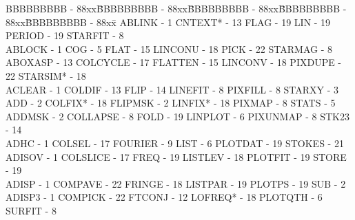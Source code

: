 {\scriptsize
\begin{tabbing}
BBBBBBBBB - 88xx\=BBBBBBBBB - 88xx\=BBBBBBBBB - 88xx\=BBBBBBBBB - 88xx\=BBBBBBBBB - 88xx\=\kill
 ABLINK - 1                              \>CNTEXT* - 13
   \>FLAG - 19                               \>
 LIN - 19                                \>PERIOD - 19
   \>STARFIT - 8                             \\
 ABLOCK - 1                              \>COG - 5
   \>FLAT - 15                               \>
 LINCONU - 18                            \>PICK - 22
   \>STARMAG - 8                             \\
 ABOXASP - 13                            \>COLCYCLE - 17
   \>FLATTEN - 15                            \>
 LINCONV - 18                            \>PIXDUPE - 22
   \>STARSIM* - 18                           \\
 ACLEAR - 1                              \>COLDIF - 13
   \>FLIP - 14                               \>
 LINEFIT - 8                             \>PIXFILL - 8
   \>STARXY - 3                              \\
 ADD - 2                                 \>COLFIX* - 18
   \>FLIPMSK - 2                             \>
 LINFIX* - 18                            \>PIXMAP - 8
   \>STATS - 5                               \\
 ADDMSK - 2                              \>COLLAPSE - 8
   \>FOLD - 19                               \>
 LINPLOT - 6                             \>PIXUNMAP - 8
   \>STK23 - 14                              \\
 ADHC - 1                                \>COLSEL - 17
   \>FOURIER - 9                             \>
 LIST - 6                                \>PLOTDAT - 19
   \>STOKES - 21                             \\
 ADISOV - 1                              \>COLSLICE - 17
   \>FREQ - 19                               \>
 LISTLEV - 18                            \>PLOTFIT - 19
   \>STORE - 19                              \\
 ADISP - 1                               \>COMPAVE - 22
   \>FRINGE - 18                             \>
 LISTPAR - 19                            \>PLOTPS - 19
   \>SUB - 2                                 \\
 ADISP3 - 1                              \>COMPICK - 22
   \>FTCONJ - 12                             \>
 LOFREQ* - 18                            \>PLOTQTH - 6
   \>SURFIT - 8                              \\

\end{tabbing}}

